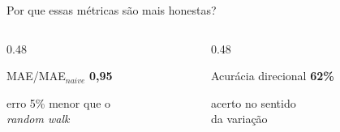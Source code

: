 \documentclass{libs/ufc_format}
\begin{document}
\begin{frame}{Por que essas métricas são mais honestas?}
    \begin{columns}
        \begin{column}{0.48\textwidth}
            \begin{exampleblock}{MAE/MAE\(_{naive}\)}
                \centering
                \Large \textbf{0,95}

                \vspace{0.2cm}
                \normalsize erro 5\% menor que o\\ \emph{random walk}
            \end{exampleblock}
        \end{column}
        \begin{column}{0.48\textwidth}
            \begin{block}{Acurácia direcional}
                \centering
                \Large \textbf{62\%}

                \vspace{0.2cm}
                \normalsize acerto no sentido\\ da variação
            \end{block}
        \end{column}
    \end{columns}

    \vspace{0.4cm}
\end{frame}
\end{document}
